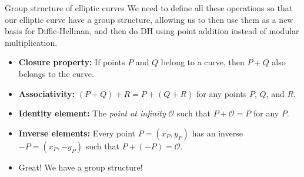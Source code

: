 \documentclass[aspectratio=169, lualatex, handout]{beamer}
\begin{document}
\begin{frame}{Group structure of elliptic curves}
	We need to define all these operations so that our elliptic curve have a group structure, allowing us to then use them as a new basis for Diffie-Hellman, and then do DH using point addition instead of modular multiplication.
	\begin{itemize}[<+->]
		\item \textbf{Closure property:} If points $P$ and $Q$ belong to a curve, then $P + Q$ also belongs to the curve.
		\item \textbf{Associativity:} $(P + Q) + R = P + (Q + R)$ for any points $P$, $Q$, and $R$.
		\item \textbf{Identity element:} The \emph{point at infinity} $\mathcal{O}$ such that $P + \mathcal{O} = P$ for any $P$.
		\item \textbf{Inverse elements:} Every point $P = (x_P, y_P)$ has an inverse $-P = (x_P, -y_P)$ such that $P + (-P) = \mathcal{O}$.
		\item Great! We have a group structure!
	\end{itemize}
\end{frame}
\end{document}

